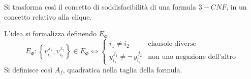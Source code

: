 Si trasforma così il concetto di soddisfacibilità di una formula $3-CNF$, in un concetto relativo alla clique.

L'idea si formalizza definendo $E_{\Phi}$
\begin{equation*}
    E_{\Phi} : 
    \left\{ 
        v_{i_1}^{\,j_1}
        ,
        v_{i_2}^{\,j_2}
    \right\}
    \in E_{\Phi} \Leftrightarrow
    \begin{cases}
        i_1 \ne i_2 
        & \text{clausole diverse}
        \\
        y_{i_1}^{\,j_1}
        \ne
        \neg \,
            y_{i_2}^{\,j_2}
        & \text{non uno negazione dell'altro}
    \end{cases}
\end{equation*}
Si definisce così $A_f$, quadratica nella taglia della formula.

